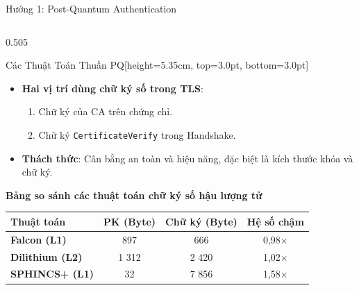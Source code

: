 \documentclass[aspectratio=169, 10pt]{beamer}
\begin{document}
\begin{frame}{Hướng 1: Post-Quantum Authentication}
	\begin{columns}[T]
		\begin{column}{0.505\textwidth}
			\begin{accentcard}[uetblue]{Các Thuật Toán Thuần PQ}[height=5.35cm, top=3.0pt, bottom=3.0pt]
				\raggedright
				\setlength{\leftmargini}{9pt}
				\begin{itemize}\setlength{\itemsep}{2.0pt}\setlength{\topsep}{0pt}\fontsize{5.8pt}{7.2pt}\selectfont
					\item \textbf{Hai vị trí dùng chữ ký số trong TLS}:
					      \begin{enumerate}\setlength{\itemsep}{1.0pt}\fontsize{5.6pt}{6.8pt}\selectfont
					          \item Chữ ký của CA trên chứng chỉ.
					          \item Chữ ký \texttt{CertificateVerify} trong Handshake.
					      \end{enumerate}
					\item \textbf{Thách thức}: Cân bằng an toàn và hiệu năng, đặc biệt là kích thước khóa và chữ ký.
				\end{itemize}
				\vspace{2.0pt}
				{\fontsize{5.8pt}{7.0pt}\selectfont\textbf{\color{uetblue}Bảng so sánh các thuật toán chữ ký số hậu lượng tử}}\par\vspace{1.5pt}
				\centering
				\fontsize{5.5pt}{6.8pt}\selectfont
				\renewcommand{\arraystretch}{1.10}
				\setlength{\tabcolsep}{2.5pt}
				\begin{tabularx}{\linewidth}{>{\raggedright\arraybackslash}X c c c}
					\toprule
					\rowcolor{uetaccentbg}
					\textbf{\color{uetblue}Thuật toán} & \textbf{\color{uetblue}PK (Byte)} & \textbf{\color{uetblue}Chữ ký (Byte)} & \textbf{\color{uetblue}Hệ số chậm} \\
					\midrule
					\textbf{Falcon (L1)} & 897 & 666 & 0,98$\times$ \\
					\rowcolor{uetlightgray}
					\textbf{Dilithium (L2)} & 1 312 & 2 420 & 1,02$\times$ \\
					\textbf{SPHINCS+ (L1)} & 32 & 7 856 & 1,58$\times$ \\
					\bottomrule
				\end{tabularx}
				\vspace{2.0pt}
				\raggedright
			\end{accentcard}
		\end{column}


\end{columns}
\end{frame}
\end{document}
